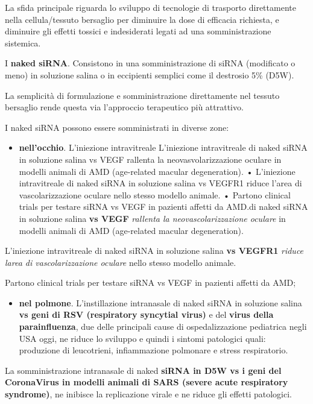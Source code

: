 \documentclass[]{article}
\begin{document}
La sfida principale riguarda lo sviluppo di tecnologie di trasporto
direttamente nella cellula/tessuto bersaglio per diminuire la dose di
efficacia richiesta, e diminuire gli effetti tossici e indesiderati
legati ad una somministrazione sistemica.

I \textbf{naked siRNA}. Consistono in una somministrazione di siRNA
(modificato o meno) in soluzione salina o in eccipienti semplici come il
destrosio 5\% (D5W).

La semplicità di formulazione e somministrazione direttamente nel
tessuto bersaglio rende questa via l'approccio terapeutico più
attrattivo.

I naked siRNA possono essere somministrati in diverse zone:

\begin{itemize}
\itemsep1pt\parskip0pt
\item
  \textbf{nell'occhio}. L'iniezione intravitreale L'iniezione
  intravitreale di naked siRNA in soluzione salina vs VEGF rallenta la
  neovasvolarizzazione oculare in modelli animali di AMD (age-related
  macular degeneration). • L'iniezione intravitreale di naked siRNA in
  soluzione salina vs VEGFR1 riduce l'area di vascolarizzazione oculare
  nello stesso modello animale. • Partono clinical trials per testare
  siRNA vs VEGF in pazienti affetti da AMD.di naked siRNA in soluzione
  salina \textbf{vs VEGF} \emph{rallenta la neovascolarizzazione
  oculare} in modelli animali di AMD (age-related macular degeneration).
\end{itemize}

L'iniezione intravitreale di naked siRNA in soluzione salina \textbf{vs
VEGFR1} \emph{riduce larea di vascolarizzazione oculare} nello stesso
modello animale.

Partono clinical trials per testare siRNA vs VEGF in pazienti affetti da
AMD;

\begin{itemize}
\itemsep1pt\parskip0pt
\item
  \textbf{nel polmone}. L'instillazione intranasale di naked siRNA in
  soluzione salina \textbf{vs geni di RSV (respiratory syncytial virus)}
  e del \textbf{virus della parainfluenza}, due delle principali cause
  di ospedalizzazione pediatrica negli USA oggi, ne riduce lo sviluppo e
  quindi i sintomi patologici quali: produzione di leucotrieni,
  infiammazione polmonare e stress respiratorio.
\end{itemize}

La somministrazione intranasale di naked \textbf{siRNA in D5W vs i geni
del CoronaVirus in modelli animali di SARS (severe acute respiratory
syndrome)}, ne inibisce la replicazione virale e ne riduce gli effetti
patologici.
\end{document}
